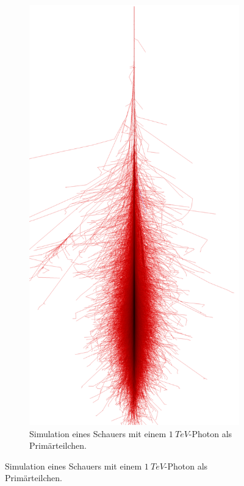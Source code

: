 \begin{figure}
 \begin{subfigure}{0.4\textwidth}
  \includegraphics[width=\textwidth]{./Plots/03_MonteCarlos/Photon_1TeV_CORSIKA.png}
  \caption{Simulation eines Schauers mit einem $\SI{1}{TeV}$-Photon als Primärteilchen.}

\end{subfigure}
\end{figure}
